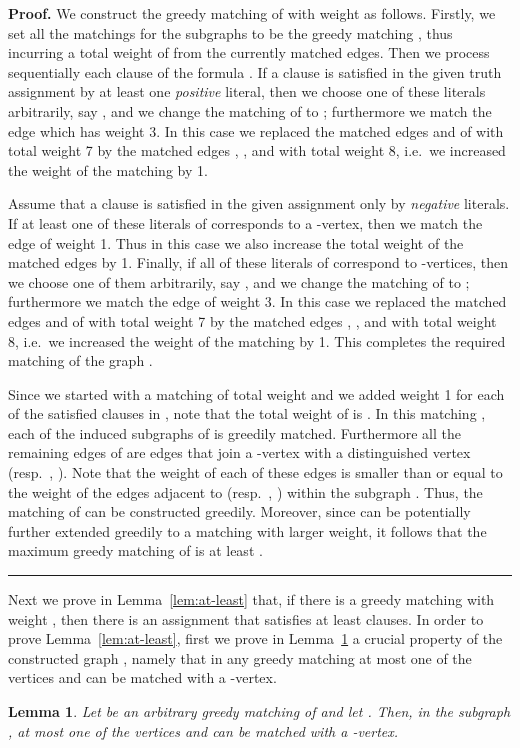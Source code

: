 \documentclass[a4paper,11pt]{article}
\newtheorem{lemma}{Lemma}
\newenvironment{proof}[1][Proof]{\noindent\textbf{#1.} }{\ \rule{0.5em}{0.5em}}
\begin{document}
\begin{proof}
We construct the greedy matching of  with weight  as follows. 
Firstly, we set all the matchings for the subgraphs  to 
be the greedy matching , thus incurring a total weight of  from the 
currently matched edges. 
Then we process sequentially each clause  of the formula . 
If a clause  is satisfied in the given truth assignment by at least one 
\emph{positive} literal, then we choose one of these literals arbitrarily, say 
, and we change the matching of  to ; 
furthermore we match the edge  which has weight 3. 
In this case we replaced the matched edges  and 
 of  with total weight 7 by the matched 
edges , , and  
with total weight 8, i.e.~we increased the weight of the matching by 1. 



Assume that a clause  is satisfied in the given assignment only by 
\emph{negative} literals. 
If at least one of these literals of  corresponds to a -vertex, then
we match the edge  of weight 1. Thus in this case we also 
increase the total weight of the matched edges by 1. 
Finally, if all of these literals of  correspond to -vertices, then
we choose one of them arbitrarily, say , and we change the matching 
of  to ; furthermore we match the edge  
of weight 3. 
In this case we replaced the matched edges  and 
 of  with total weight 7 by the matched edges 
, , and  with total 
weight 8, i.e.~we increased the weight of the matching by 1. 
This completes the required matching  of the graph . 


Since we started with a matching of total weight  and we added weight 1 for
each of the  satisfied clauses in , note that the total weight of 
 is . 
In this matching , each of the induced subgraphs  of 
 is greedily matched. 
Furthermore all the remaining edges of  are edges that join a -vertex with
a distinguished vertex  (resp.~, ). 
Note that the weight of each of these edges is smaller than or equal to the 
weight of the edges adjacent to  (resp.~, )
within the subgraph . 
Thus, the matching  of  can be constructed greedily. Moreover, 
since  can be potentially further extended greedily to a matching 
with larger weight, it follows that the maximum greedy matching of  is at 
least .
\end{proof}

\medskip

Next we prove in Lemma~\ref{lem:at-least} that, if there is a greedy matching 
with weight , then there is an assignment that satisfies at least  
clauses.
In order to prove Lemma~\ref{lem:at-least}, first we prove in Lemma~\ref{lem:one-of-ag} a crucial property of the constructed graph , 
namely that in any greedy matching at most one of the vertices  and  can be matched with a -vertex.
\begin{lemma}
\label{lem:one-of-ag}
Let  be an arbitrary greedy matching of  and let 
. Then, in the subgraph , at most one of 
the vertices  and  can be matched with a -vertex.
\end{lemma}
\end{document}
